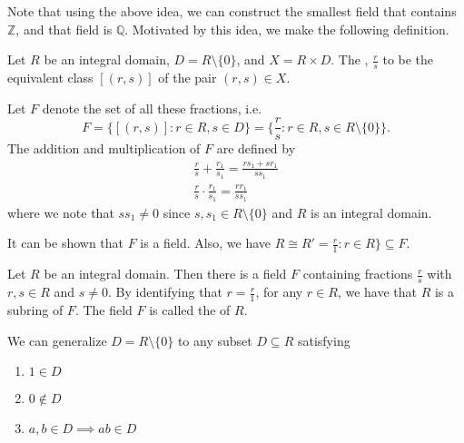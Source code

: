 Note that using the above idea, we can construct the smallest field that contains $\mathbb{Z}$, and that field is $\mathbb{Q}$. Motivated by this idea, we make the following definition.

\begin{defn}[Fraction]
\label{defn:fraction}
  Let $R$ be an integral domain, $D = R \setminus \{0\}$, and $X = R \times D$. The , $\frac{r}{s}$ to be the equivalent class $[(r, s)]$ of the pair $(r, s) \in X$.
\end{defn}

Let $F$ denote the set of all these fractions, i.e.
\begin{equation*}
  F = \{ [ (r, s) ] : r \in R, s \in D \} = \{ \frac{r}{s} : r \in R, s \in R \setminus \{0\} \}.
\end{equation*}
The addition and multiplication of $F$ are defined by
\begin{gather*}
  \frac{r}{s} + \frac{r_1}{s_1} = \frac{rs_1 + sr_1}{ss_1} \\
  \frac{r}{s} \cdot \frac{r_1}{s_1} = \frac{rr_1}{ss_1}
\end{gather*}
where we note that $ss_1 \neq 0$ since $s, s_1 \in R \setminus \{0\}$ and $R$ is an integral domain.

It can be shown that $F$ is a field. Also, we have $R \cong R' = \frac{r}{1} : r \in R \} \subseteq F$.

\begin{thm}
\label{thm:field_of_fractions}
  Let $R$ be an integral domain. Then there is a field $F$ containing fractions $\frac{r}{s}$ with $r, s \in R$ and $s \neq 0$. By identifying that $r = \frac{r}{1}$, for any $r \in R$, we have that $R$ is a subring of $F$. The field $F$ is called the  of $R$.
\end{thm}

\begin{note}
  We can generalize $D = R \setminus \{0\}$ to any subset $D \subseteq R$ satisfying
  \begin{enumerate}
    \item $1 \in D$
    \item $0 \notin D$
    \item $a, b \in D \implies ab \in D$
  \end{enumerate}
\end{note}



